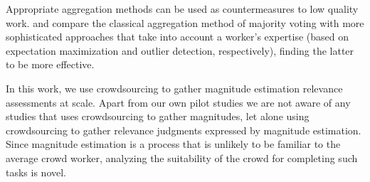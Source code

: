 Appropriate aggregation methods can be used as countermeasures to low
quality work. 
\citet{Hosseini:2012} and \citet{Jung2011} compare the classical
aggregation method of majority voting with more sophisticated
approaches that take into account a worker's expertise (based on
expectation maximization and outlier detection, respectively), finding
the latter to be more effective. 


In this work, we use crowdsourcing to gather magnitude estimation
relevance assessments at scale.
Apart from our own pilot studies \citep{SchMad14,MadMiz15} we
are not aware of any studies that uses crowdsourcing to gather magnitudes,
let alone using crowdsourcing to gather relevance judgments expressed
by magnitude estimation.
Since magnitude estimation is a process that is unlikely to be familiar
to the average crowd worker, analyzing the suitability of the crowd for
completing such tasks is novel.



